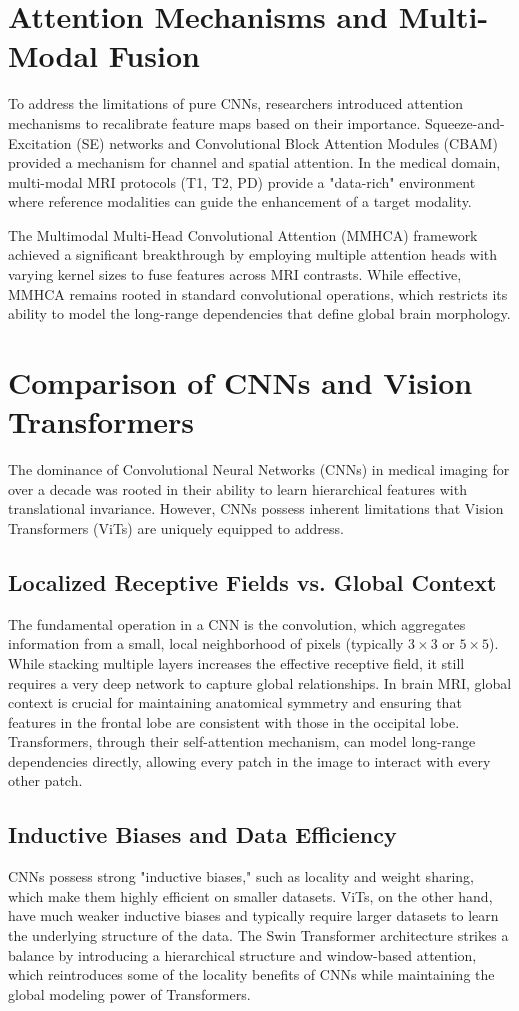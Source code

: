 \section{Attention Mechanisms and Multi-Modal Fusion}
To address the limitations of pure CNNs, researchers introduced attention mechanisms to recalibrate feature maps based on their importance. Squeeze-and-Excitation (SE) networks and Convolutional Block Attention Modules (CBAM) provided a mechanism for channel and spatial attention. In the medical domain, multi-modal MRI protocols (T1, T2, PD) provide a "data-rich" environment where reference modalities can guide the enhancement of a target modality.

The Multimodal Multi-Head Convolutional Attention (MMHCA) framework achieved a significant breakthrough by employing multiple attention heads with varying kernel sizes to fuse features across MRI contrasts. While effective, MMHCA remains rooted in standard convolutional operations, which restricts its ability to model the long-range dependencies that define global brain morphology.

\section{Comparison of CNNs and Vision Transformers}
The dominance of Convolutional Neural Networks (CNNs) in medical imaging for over a decade was rooted in their ability to learn hierarchical features with translational invariance. However, CNNs possess inherent limitations that Vision Transformers (ViTs) are uniquely equipped to address.

\subsection{Localized Receptive Fields vs. Global Context}
The fundamental operation in a CNN is the convolution, which aggregates information from a small, local neighborhood of pixels (typically $3 \times 3$ or $5 \times 5$). While stacking multiple layers increases the effective receptive field, it still requires a very deep network to capture global relationships. In brain MRI, global context is crucial for maintaining anatomical symmetry and ensuring that features in the frontal lobe are consistent with those in the occipital lobe. Transformers, through their self-attention mechanism, can model long-range dependencies directly, allowing every patch in the image to interact with every other patch.

\subsection{Inductive Biases and Data Efficiency}
CNNs possess strong "inductive biases," such as locality and weight sharing, which make them highly efficient on smaller datasets. ViTs, on the other hand, have much weaker inductive biases and typically require larger datasets to learn the underlying structure of the data. The Swin Transformer architecture strikes a balance by introducing a hierarchical structure and window-based attention, which reintroduces some of the locality benefits of CNNs while maintaining the global modeling power of Transformers.

